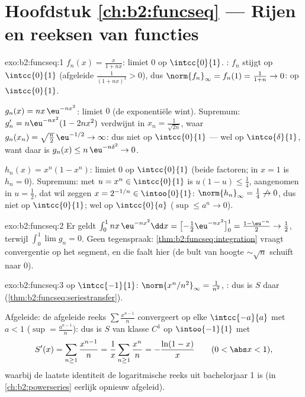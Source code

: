 \section*{Hoofdstuk \ref{ch:b2:funcseq} --- Rijen en reeksen van
functies}

\begin{solution}{exo:b2:funcseq:1}
$f_n(x) = \frac{x}{1 + nx}$:  limiet $0$ op
$\intcc{0}{1}$. : $f_n$ stijgt op $\intcc{0}{1}$ (afgeleide
$\frac{1}{(1+nx)^2} > 0$), dus $\norm{f_n}_\infty = f_n(1) =
\frac{1}{1+n} \to 0$: \emph{} op $\intcc{0}{1}$.

$g_n(x) = nx\,\eu^{-nx^2}$:  limiet $0$ (de
exponentiële wint). Supremum: $g_n' = n\eu^{-nx^2}(1 - 2nx^2)$
verdwijnt in $x_n = \frac{1}{\sqrt{2n}}$, waar $g_n(x_n) =
\sqrt{\frac n2}\,\eu^{-1/2} \to \infty$: dus niet  op
$\intcc{0}{1}$ --- wel  op $\intco{\delta}{1}$, want daar is
$g_n(x) \leq n\,\eu^{-n\delta^2} \to 0$.

$h_n(x) = x^n(1 - x^n)$:  limiet $0$ op $\intcc{0}{1}$
(beide factoren; in $x = 1$ is $h_n = 0$). Supremum: met $u = x^n
\in \intcc{0}{1}$ is $u(1-u) \leq \frac14$, aangenomen in $u =
\frac12$, dat wil zeggen $x = 2^{-1/n} \in \intoo{0}{1}$:
$\norm{h_n}_\infty = \frac14 \not\to 0$, dus niet  op
$\intcc{0}{1}$; wel  op $\intcc{0}{a}$ ($\sup \leq a^n \to
0$).
\end{solution}

\begin{solution}{exo:b2:funcseq:2}
Er geldt $\int_0^1 nx\,\eu^{-nx^2}\dd x = \bigl[-\tfrac12
\eu^{-nx^2}\bigr]_0^1 = \frac{1 - \eu^{-n}}{2} \to \frac12$,
terwijl $\int_0^1 \lim g_n = 0$. Geen tegenspraak:
\cref{thm:b2:funcseq:integration} vraagt \emph{}
convergentie op het segment, en die faalt hier (de bult van hoogte
$\sim\sqrt n$ schuift naar $0$).
\end{solution}

\begin{solution}{exo:b2:funcseq:3}
 op $\intcc{-1}{1}$: $\norm{x^n/n^2}_\infty =
\frac{1}{n^2}$, : dus is $S$ daar 
(\cref{thm:b2:funcseq:seriestransfer}).

Afgeleide: de afgeleide reeks $\sum \frac{x^{n-1}}{n}$ convergeert
 op elke $\intcc{-a}{a}$ met $a < 1$ ($\sup =
\frac{a^{n-1}}{n}$): dus is $S$ van klasse $C^1$ op $\intoo{-1}{1}$
met
\[
S'(x) = \sum_{n\geq1} \frac{x^{n-1}}{n} = \frac1x \sum_{n\geq1}
\frac{x^n}{n} = -\frac{\ln(1 - x)}{x}
\qquad (0 < \abs x < 1),
\]
waarbij de laatste identiteit de logaritmische reeks uit
bachelorjaar 1 is (in \cref{ch:b2:powerseries} eerlijk opnieuw
afgeleid).
\end{solution}

